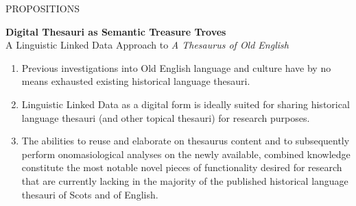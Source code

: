 \documentclass[twoside,openright,11pt]{book}
\begin{document}
\begin{center}

{PROPOSITIONS}

\bigskip
%
%


    \textsf{
    {\Large\bfseries
      Digital Thesauri as Semantic Treasure Troves\\[0.3em]
    }
    {
      A Linguistic Linked Data Approach to %
      \emph{A Thesaurus of Old English}\\
    }
    }

\bigskip

\end{center}

\small 

\begin{adjustwidth}{-1.25em}{-0.25em}
\begin{enumerate}


\item Previous investigations into Old English language and culture have by no means exhausted existing historical language thesauri. 

\item Linguistic Linked Data as a digital form is ideally suited for sharing historical language thesauri (and other topical thesauri) for research purposes.%

\item The abilities to reuse and elaborate on thesaurus content and to subsequently perform onomasiological analyses on the newly available, combined knowledge constitute the most notable novel pieces of functionality desired for research that are currently lacking in the majority of the published historical language thesauri of Scots and of English.


\end{enumerate}
\end{adjustwidth}
\end{document}
